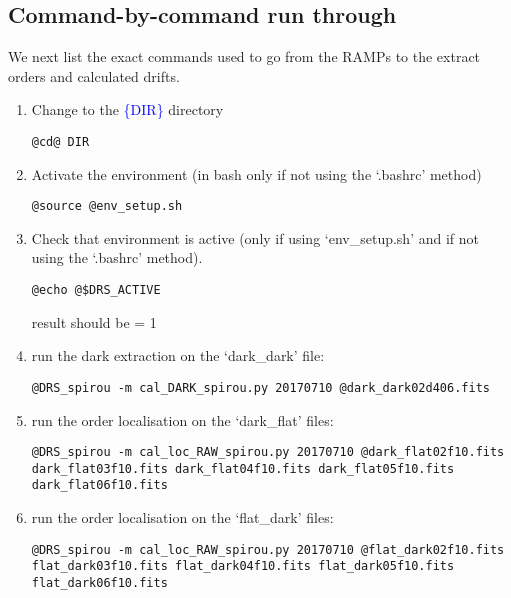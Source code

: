 \subsection{Command-by-command run through}

\noindent We next list the exact commands used to go from the RAMPs to the extract orders and calculated drifts.
\begin{enumerate}
\item Change to the \textcolor{blue}{\{DIR\}} directory
\begin{lstlisting}[style=bashstyle]
@cd@ DIR
\end{lstlisting}  

\item Activate the environment (in bash only if not using the `.bashrc' method)
\begin{lstlisting}[style=bashstyle]
@source @env_setup.sh
\end{lstlisting}  

\item Check that environment is active (only if using `env\_setup.sh' and if not using the `.bashrc' method).
\begin{lstlisting}[style=bashstyle]
@echo @$DRS_ACTIVE
\end{lstlisting}  

\noindent result should be = 1

\item run the dark extraction on the `dark\_dark' file:
\begin{lstlisting}[style=bashstyle]
@DRS_spirou -m cal_DARK_spirou.py 20170710 @dark_dark02d406.fits
\end{lstlisting}  

\item run the order localisation on the `dark\_flat' files:
\begin{lstlisting}[style=bashstyle]
@DRS_spirou -m cal_loc_RAW_spirou.py 20170710 @dark_flat02f10.fits dark_flat03f10.fits dark_flat04f10.fits dark_flat05f10.fits dark_flat06f10.fits
\end{lstlisting}  

\item run the order localisation on the `flat\_dark' files:
\begin{lstlisting}[style=bashstyle]
@DRS_spirou -m cal_loc_RAW_spirou.py 20170710 @flat_dark02f10.fits flat_dark03f10.fits flat_dark04f10.fits flat_dark05f10.fits flat_dark06f10.fits
\end{lstlisting}  


\end{enumerate}
